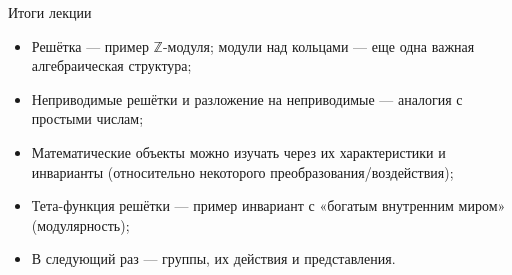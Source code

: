 \documentclass[serif, aspectratio=169]{beamer}
\begin{document}
\begin{frame}{Итоги лекции}
    \begin{itemize}
        \item Решётка --- пример $\mathbb{Z}$-модуля; модули над кольцами --- еще одна важная алгебраическая структура;
        \item Неприводимые решётки и разложение на неприводимые --- аналогия с простыми числам;
        \item Математические объекты можно изучать через их характеристики и инварианты (относительно некоторого преобразования/воздействия);
        \item Тета-функция решётки --- пример инвариант с «богатым внутренним миром» (модулярность);
        \item В следующий раз --- группы, их действия и представления.
    \end{itemize}
\end{frame}
\note{%
\begin{itemize}
    \item ---
\end{itemize}
}

\end{document}
